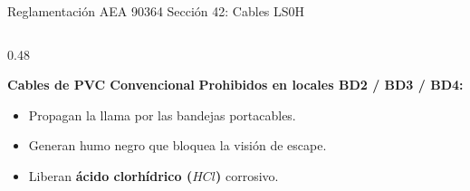 \begin{frame}{Reglamentación AEA 90364 Sección 42: Cables LS0H}
  \begin{columns}[T]
    \begin{column}{0.48\textwidth}
      \begin{block}{\textbf{Cables de PVC Convencional}}
        \small\textcolor{firered}{\textbf{Prohibidos en locales BD2 / BD3 / BD4:}}
        \vspace{0.05cm}
        \begin{itemize}
          \footnotesize
          \setlength{\itemsep}{3pt}
          \item Propagan la llama por las bandejas portacables.
          \item Generan humo negro que bloquea la visión de escape.
          \item Liberan \textbf{ácido clorhídrico ($HCl$)} corrosivo.
        \end{itemize}
      \end{block}
      \vspace{0.15cm}
      \centering
    \end{column}


\end{columns}
\end{frame}
